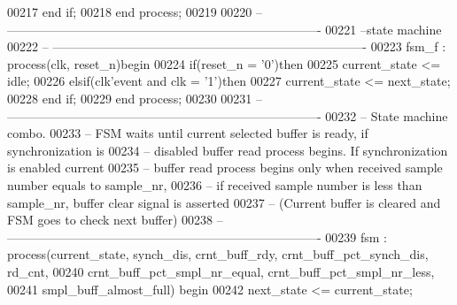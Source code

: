 \begin{DoxyCode}
00217       \textcolor{keywordflow}{end} \textcolor{keywordflow}{if};
00218    \textcolor{keywordflow}{end} \textcolor{keywordflow}{process};
00219    
00220 \textcolor{keyword}{-- ----------------------------------------------------------------------------}
00221 \textcolor{keyword}{--state machine}
00222 \textcolor{keyword}{-- ----------------------------------------------------------------------------}
00223    fsm\_f : \textcolor{keywordflow}{process}(clk, reset_n)\textcolor{keywordflow}{begin}
00224       \textcolor{keywordflow}{if}\textcolor{vhdlchar}{(}\textcolor{vhdlchar}{reset_n} \textcolor{vhdlchar}{=} \textcolor{vhdlchar}{'}\textcolor{vhdllogic}{}\textcolor{vhdllogic}{0}\textcolor{vhdlchar}{'}\textcolor{vhdlchar}{)}\textcolor{keywordflow}{then}
00225          \textcolor{vhdlchar}{current_state} \textcolor{vhdlchar}{<=} \textcolor{vhdlchar}{idle};
00226       \textcolor{keywordflow}{elsif}\textcolor{vhdlchar}{(}\textcolor{vhdlchar}{clk}\textcolor{vhdlchar}{'}\textcolor{vhdlkeyword}{event} \textcolor{keywordflow}{and} \textcolor{vhdlchar}{clk} \textcolor{vhdlchar}{=} \textcolor{vhdlchar}{'}\textcolor{vhdllogic}{}\textcolor{vhdllogic}{1}\textcolor{vhdlchar}{'}\textcolor{vhdlchar}{)}\textcolor{keywordflow}{then}
00227          \textcolor{vhdlchar}{current_state} \textcolor{vhdlchar}{<=} \textcolor{vhdlchar}{next_state};
00228       \textcolor{keywordflow}{end} \textcolor{keywordflow}{if};
00229    \textcolor{keywordflow}{end} \textcolor{keywordflow}{process};
00230 
00231 \textcolor{keyword}{-- ----------------------------------------------------------------------------}
00232 \textcolor{keyword}{-- State machine combo.}
00233 \textcolor{keyword}{-- FSM waits until current selected buffer is ready, if synchronization is }
00234 \textcolor{keyword}{-- disabled buffer read process begins. If synchronization is enabled current }
00235 \textcolor{keyword}{-- buffer read process begins only when received sample number equals to sample\_nr,}
00236 \textcolor{keyword}{-- if received sample number is less than sample\_nr, buffer clear signal is asserted}
00237 \textcolor{keyword}{-- (Current buffer is cleared and FSM goes to check next buffer)}
00238 \textcolor{keyword}{-- ----------------------------------------------------------------------------}
00239    fsm : \textcolor{keywordflow}{process}(current_state, synch_dis, crnt_buff_rdy, 
      crnt_buff_pct_synch_dis, rd_cnt,
00240                   crnt_buff_pct_smpl_nr_equal, crnt_buff_pct_smpl_nr_less,
00241                   smpl_buff_almost_full) \textcolor{keywordflow}{begin}
00242       \textcolor{vhdlchar}{next_state} \textcolor{vhdlchar}{<=} \textcolor{vhdlchar}{current_state};

\end{DoxyCode}
